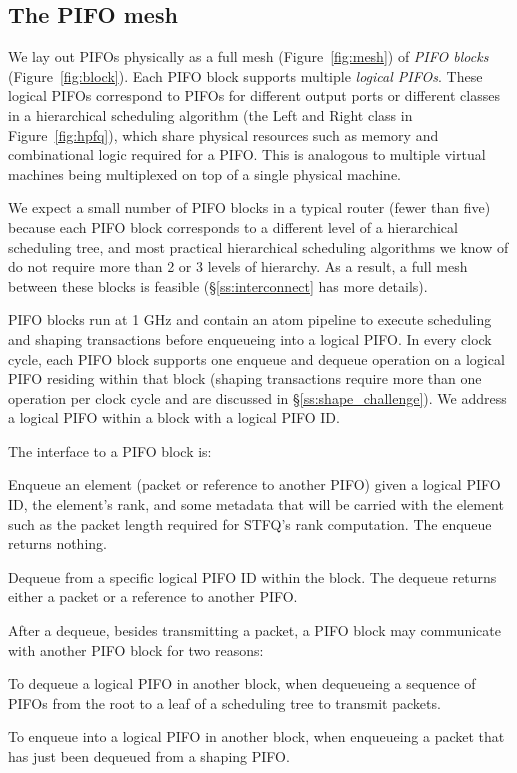 \subsection{The PIFO mesh}
\label{ss:mesh}

We lay out PIFOs physically as a full mesh (Figure~\ref{fig:mesh}) of {\em PIFO
blocks} (Figure~\ref{fig:block}). Each PIFO block supports multiple {\em
logical PIFOs}. These logical PIFOs correspond to PIFOs for different output
ports or different classes in a hierarchical scheduling algorithm (\eg the Left
and Right class in Figure~\ref{fig:hpfq}), which share physical resources such
as memory and combinational logic required for a PIFO.  This is analogous to
multiple virtual machines being multiplexed on top of a single physical
machine.

We expect a small number of PIFO blocks in a typical router (\eg fewer than
five) because each PIFO block corresponds to a different level of a
hierarchical scheduling tree, and most practical hierarchical scheduling
algorithms we know of do not require more than 2 or 3 levels of hierarchy. As a
result, a full mesh between these blocks is feasible (\S\ref{ss:interconnect}
has more details).

PIFO blocks run at 1 GHz and contain an atom pipeline to execute scheduling and
shaping transactions before enqueueing into a logical PIFO. In every clock
cycle, each PIFO block supports one enqueue and dequeue operation on a logical
PIFO residing within that block (shaping transactions require more than one
operation per clock cycle and are discussed in \S\ref{ss:shape_challenge}). We
address a logical PIFO within a block with a logical PIFO ID.

The interface to a PIFO block is:
\begin{CompactEnumerate}
\item Enqueue an element (packet or reference to another PIFO) given a
  logical PIFO ID, the element's rank, and some metadata that will be
  carried with the element such as the packet length required for
  STFQ's rank computation. The enqueue returns nothing.
\item Dequeue from a specific logical PIFO ID within the block. The dequeue
  returns either a packet or a reference to another PIFO.
\end{CompactEnumerate}

After a dequeue, besides transmitting a packet, a PIFO block may communicate
with another PIFO block for two reasons:
 \begin{CompactEnumerate}
 \item To dequeue a logical PIFO in another block, \eg when dequeueing a
   sequence of PIFOs from the root to a leaf of a scheduling tree to transmit
   packets.
 
 \item To enqueue into a logical PIFO in another block, \eg when
   enqueueing a packet that has just been dequeued from a shaping
   PIFO.
 \end{CompactEnumerate}

